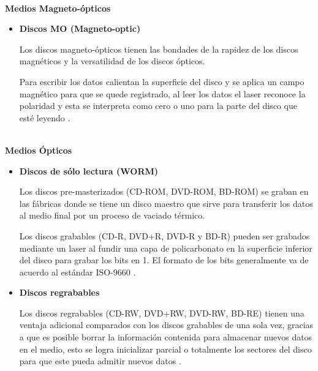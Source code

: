 \textbf{\\ Medios Magneto-\'{o}pticos \\}

\begin{itemize}

  \item \textbf{Discos MO (Magneto-optic)}

Los discos magneto-\'{o}pticos tienen las bondades de la rapidez de los discos magn\'{e}ticos y la versatilidad de los discos \'{o}pticos.

Para escribir los datos calientan la superficie del disco y se aplica un campo magn\'{e}tico para que se quede registrado, al leer los datos el laser reconoce la polaridad y esta se interpreta como cero o uno para la parte del disco que est\'{e} leyendo \cite{_illustrated_????}.

\end{itemize}

\textbf{\\ Medios \'{O}pticos \\}

\begin{itemize}

  \item \textbf{Discos de s\'{o}lo lectura (WORM)}

Los discos pre-masterizados (\textsc{CD-ROM}, \textsc{DVD-ROM}, \textsc{BD-ROM}) se graban en las f\'{a}bricas donde se tiene un disco maestro que sirve para transferir los datos al medio final por un proceso de vaciado t\'{e}rmico.

Los discos grabables (\textsc{CD-R}, \textsc{DVD+R}, \textsc{DVD-R} y \textsc{BD-R}) pueden ser grabados mediante un laser al fundir una capa de policarbonato en la superficie inferior del disco para grabar los bits en 1. El formato de los bits generalmente va de acuerdo al est\'{a}ndar \textsc{ISO-9660} \cite{_further_????}.

  \item \textbf{Discos regrabables}

Los discos regrabables (\textsc{CD-RW}, \textsc{DVD+RW}, \textsc{DVD-RW}, \textsc{BD-RE}) tienen una ventaja adicional comparados con los discos grabables de una sola vez, gracias a que es posible borrar la informaci\'{o}n contenida para almacenar nuevos datos en el medio, esto se logra inicializar parcial o totalmente los sectores del disco para que este pueda admitir nuevos datos \cite{_odd_????}.

\end{itemize}

